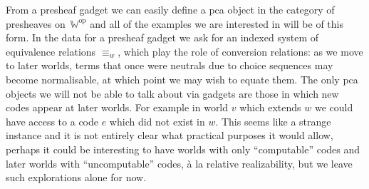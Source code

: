 \documentclass[11pt]{article}
\newtheorem{defn}[thrm]{Definition}
\begin{document}

From a presheaf gadget we can easily define a pca object in
the category of presheaves on~\(\mathbb{W}^{\text{op}}\) and all of the examples
we are interested in will be of this form.
%
In the data for a presheaf gadget we ask for an indexed system of equivalence
relations \(\equiv_{w}\), which play the role of conversion relations: as we
move to later worlds, terms that once were neutrals due to choice sequences
may become normalisable, at which point we may wish to equate them.
%
The only pca objects we will not be able to talk about via gadgets
are those in which new codes appear at later worlds.
%
For example in world \(v\) which extends \(w\) we could have access to a code
\(e\) which did not exist in \(w\).
%
This seems like a strange instance and it is not entirely clear what
practical purposes it would allow, perhaps it could be interesting
to have worlds with only ``computable'' codes and later worlds
with ``uncomputable'' codes, \`a la relative realizability, but we
leave such explorations alone for now.
\end{document}
